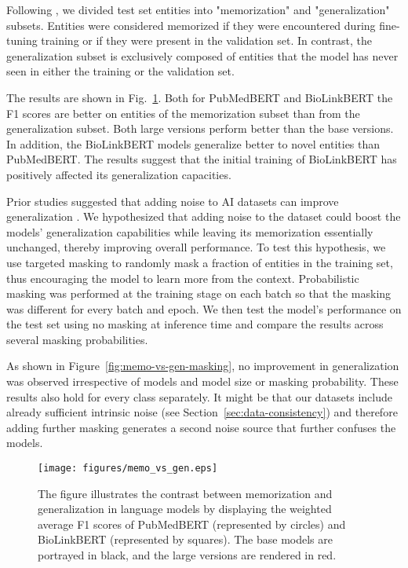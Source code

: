 \documentclass{bioinfo}
\begin{document}
Following \citep{Kim2021HowDY-memory}, we divided test set entities into "memorization" and "generalization" subsets. Entities were considered memorized if they were encountered during fine-tuning training or if they were present in the validation set. In contrast, the generalization subset is exclusively composed of entities that the model has never seen in either the training or the validation set. 

The results are shown in Fig.~\ref{fig:memo-vs-gen}. Both for PubMedBERT and BioLinkBERT the F1 scores are better on entities of the memorization subset than from the generalization subset. Both large versions perform better than the base versions. In addition, the BioLinkBERT models generalize better to novel entities than PubMedBERT. The results suggest that the initial training of BioLinkBERT has positively affected its generalization capacities.

Prior studies suggested that adding noise to AI datasets can improve generalization \citep[e.g.,][]{guozhong96,Ciresan2010DeepBS,Zur2009NoiseIF}. We hypothesized that adding noise to the dataset could boost the models' generalization capabilities while leaving its memorization essentially unchanged, thereby improving overall performance. To test this hypothesis, we use targeted masking to randomly mask a fraction of entities in the training set, thus encouraging the model to learn more from the context. Probabilistic masking was performed at the training stage on each batch so that the masking was different for every batch and epoch. We then test the model's performance on the test set using no masking at inference time and compare the results across several masking probabilities. 

As shown in Figure~\ref{fig:memo-vs-gen-masking}, no improvement in generalization was observed irrespective of models and model size or masking probability. These results also hold for every class separately. It might be that our datasets include already sufficient intrinsic noise (see Section~\ref{sec:data-consistency}) and therefore adding further masking generates a second noise source that further confuses the models. 

\begin{figure}\centering
\texttt{[image: figures/memo\_vs\_gen.eps]}
\caption{The figure illustrates the contrast between memorization and generalization in language models by displaying the weighted average F1 scores of PubMedBERT (represented by circles) and BioLinkBERT (represented by squares). The base models are portrayed in black, and the large versions are rendered in red.}
\label{fig:memo-vs-gen}
\end{figure}
\end{document}
